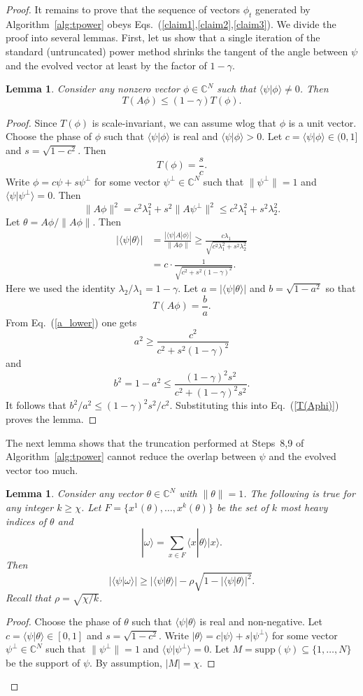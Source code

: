\documentclass[
  reprint,            %
  amsmath,amssymb,
  aps,
  superscriptaddress, %
  longbibliography
]{revtex4-2}
\newtheorem{lemma}[theorem]{Lemma}
\theoremstyle{definition}
\newcommand{\CC}{\mathbb{C}}
\newcommand{\la}{\langle}
\newcommand{\ra}{\rangle}
\newcommand{\be}{\begin{equation}}
\newcommand{\ee}{\end{equation}}
\begin{document}
\begin{proof}
It remains to prove that the sequence of vectors $\phi_t$ generated by
Algorithm~\ref{alg:tpower} obeys  Eqs.~(\ref{claim1},\ref{claim2},\ref{claim3}).
We divide the proof into several lemmas.
First, let us  show that a single iteration of the standard (untruncated)  power method 
shrinks the tangent of the angle between $\psi$ and the evolved vector at least by the factor of $1-\gamma$.
\begin{lemma}
\label{lemma:1}
Consider any nonzero vector $\phi\in \CC^N$ such that $\la \psi|\phi\ra\ne 0$.
Then 
\[
T(A\phi) \le (1-\gamma) T(\phi).
\]
\end{lemma}
\begin{proof}
Since $T(\phi)$ is scale-invariant, we can assume wlog
 that $\phi$ is a unit vector. Choose the phase of $\phi$ such that $\la \psi|\phi\ra$ is real
 and $\la \psi|\phi\ra>0$. 
Let $c = \la \psi|\phi\ra \in (0,1]$ and $s=\sqrt{1-c^2}$. 
Then 
\[
T(\phi)=\frac{s}{c}.
\]
Write $\phi = c \psi  +s \psi^\perp$
for some vector $\psi^\perp\in \CC^N$ such that $\|\psi^\perp\|=1$ and $\la \psi|\psi^\perp\ra=0$. Then
\[
\| A\phi\|^2 = c^2 \lambda_1^2 + s^2 \| A \psi^\perp\|^2 \le c^2 \lambda_1^2 + s^2 \lambda_2^2.
\]
Let $\theta=A\phi/\|A\phi\|$. Then
\begin{align}
\label{a_lower}
|\la \psi|\theta\ra| & = \frac{|\la \psi|A|\phi\ra|}{\|A \phi\|} \ge \frac{c\lambda_1}{\sqrt{c^2 \lambda_1^2 + s^2 \lambda_2^2}} \nonumber \\
& =c \cdot \frac1{\sqrt{c^2 + s^2 (1-\gamma)^2}}.
\end{align}
Here we used the identity $\lambda_2/\lambda_1=1-\gamma$.
Let $a=|\la \psi|\theta\ra|$ and $b=\sqrt{1-a^2}$ so that 
\be
\label{T(Aphi)}
T(A\phi)=\frac{b}{a}.
\ee
From Eq.~(\ref{a_lower}) one gets
\[
a^2 \ge \frac{c^2}{c^2 + s^2 (1-\gamma)^2} 
\]
and
\[
b^2=1-a^2 \le \frac{(1-\gamma)^2 s^2 }{c^2 + (1-\gamma)^2 s^2}.
\]
It follows that $b^2/a^2 \le (1-\gamma)^2 s^2/c^2$. Substituting this into Eq.~(\ref{T(Aphi)}) proves the lemma.
\end{proof}

The next lemma shows that the truncation  performed at Steps~8,9 of Algorithm~\ref{alg:tpower} 
cannot reduce the overlap between $\psi$ and the evolved vector too much.
\begin{lemma}
\label{lemma:2}
Consider any vector $\theta \in \CC^N$ with $\|\theta\|=1$. 
The following is true for any integer
$k\ge \chi$.
Let $F=\{x^1(\theta),\ldots,x^k(\theta)\}$ be the set of $k$ most heavy indices of $\theta$ and 
\[
|\omega\ra = \sum_{x\in F} \la x|\theta\ra |x\ra.
\]
Then
\[
|\la \psi|\omega\ra| \ge |\la \psi|\theta\ra| - \rho \sqrt{1-|\la \psi|\theta\ra|^2}.
\]
Recall that $\rho = \sqrt{\chi/k}$.
\end{lemma}
\begin{proof}
Choose the phase of $\theta$ such that $\la \psi|\theta\ra$ is real and non-negative.
Let $c = \la \psi|\theta\ra \in [0,1]$ and $s=\sqrt{1-c^2}$. 
Write $|\theta\ra = c|\psi\ra + s|\psi^\perp\ra$ for some vector
$\psi^\perp\in \CC^N$ such that $\|\psi^\perp\|=1$ and $\la \psi|\psi^\perp\ra=0$.
Let $M=\mathrm{supp}(\psi)\subseteq \{1,\ldots,N\}$ be the support of $\psi$.
By assumption, $|M|=\chi$. 


\end{proof}
\end{proof}
\end{document}
